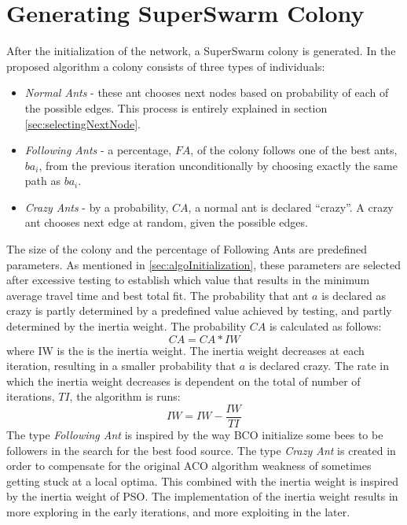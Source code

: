\section{Generating SuperSwarm Colony}
After the initialization of the network, a SuperSwarm colony is generated. In the proposed algorithm a colony consists of three types of individuals:
\begin{itemize}
\item \textit{Normal Ants} - these ant chooses next nodes based on probability of each of the possible edges. This process is entirely explained in section \vref{sec:selectingNextNode}.
\item \textit{Following Ants} - a percentage, $FA$, of the colony follows one of the best ants, $ba_i$, from the previous iteration unconditionally by choosing exactly the same path as $ba_i$.
\item \textit{Crazy Ants} - by a probability, $CA$, a normal ant is declared ``crazy''. A crazy ant chooses next edge at random, given the possible edges.  
\end{itemize}

The size of the colony and the percentage of Following Ants are predefined parameters. As mentioned in \vref{sec:algoInitialization}, these parameters are selected after excessive testing to establish which value that results in the minimum average travel time and best total fit. The probability that ant $a$ is declared as crazy is partly determined by a predefined value achieved by testing, and partly determined by the inertia weight. The probability $CA$ is calculated as follows: 
\newline
$$CA = CA*IW$$
\newline
where IW is the is the inertia weight. The inertia weight decreases at each iteration, resulting in a smaller probability that $a$ is declared crazy. The rate in which the inertia weight decreases is dependent on the total of number of iterations, $TI$, the algorithm is runs:
\newline
$$IW = IW - \frac{IW}{TI}$$
\newline
The type \textit{Following Ant} is inspired by the way BCO initialize some bees to be followers in the search for the best food source. The type \textit{Crazy Ant} is created in order to compensate for the original ACO algorithm weakness of sometimes getting stuck at a local optima. This combined with the inertia weight is inspired by the inertia weight of PSO. The implementation of the inertia weight results in more exploring in the early iterations, and more exploiting in the later. 